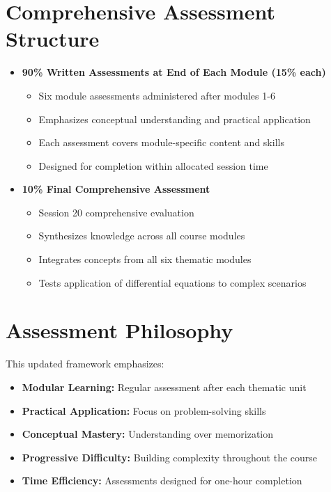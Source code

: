 \documentclass[12pt, letterpaper]{book}
\theoremstyle{problemstyle}
\theoremstyle{solutionstyle}
\begin{document}
\section{Comprehensive Assessment Structure}
\begin{itemize}
    \item \textbf{90\% Written Assessments at End of Each Module (15\% each)}
    \begin{itemize}
        \item Six module assessments administered after modules 1-6
        \item Emphasizes conceptual understanding and practical application
        \item Each assessment covers module-specific content and skills
        \item Designed for completion within allocated session time
    \end{itemize}

    \item \textbf{10\% Final Comprehensive Assessment}
    \begin{itemize}
        \item Session 20 comprehensive evaluation
        \item Synthesizes knowledge across all course modules
        \item Integrates concepts from all six thematic modules
        \item Tests application of differential equations to complex scenarios
    \end{itemize}
\end{itemize}

\section{Assessment Philosophy}
This updated framework emphasizes:
\begin{itemize}
    \item \textbf{Modular Learning:} Regular assessment after each thematic unit
    \item \textbf{Practical Application:} Focus on problem-solving skills
    \item \textbf{Conceptual Mastery:} Understanding over memorization
    \item \textbf{Progressive Difficulty:} Building complexity throughout the course
    \item \textbf{Time Efficiency:} Assessments designed for one-hour completion
\end{itemize}
\end{document}
